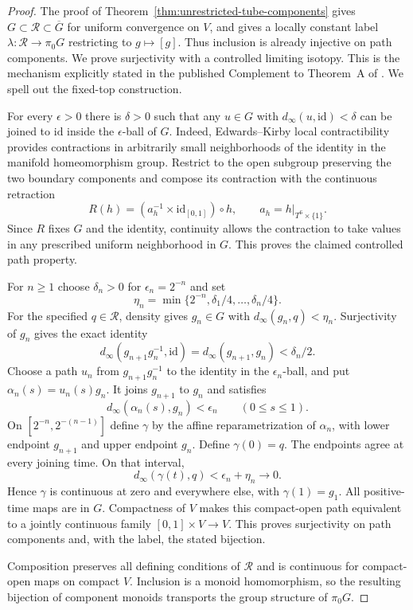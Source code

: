 \begin{proof}
The proof of Theorem~\ref{thm:unrestricted-tube-components} gives
$G\subset\mathcal R\subset\overline G$ for uniform convergence on
$V$, and gives a locally constant label
$\lambda:\mathcal R\to\pi_0G$ restricting to $g\mapsto[g]$.
Thus inclusion is already injective on path components.
We prove surjectivity with a controlled limiting isotopy.
This is the mechanism explicitly stated in the published Complement
to Theorem~A of
\cite[p.~272]{Siebenmann1972Approximation}.
We spell out the fixed-top construction.

For every $\epsilon>0$ there is $\delta>0$ such that any
$u\in G$ with $d_\infty(u,\mathrm{id})<\delta$ can be joined to
$\mathrm{id}$ inside the $\epsilon$-ball of $G$.
Indeed, Edwards--Kirby local contractibility
\cite[Corollary~1.1, pp.~63, 77]{EdwardsKirby1971}
provides contractions in arbitrarily small neighborhoods of the
identity in the manifold homeomorphism group.
Restrict to the open subgroup preserving the two boundary components
and compose its contraction with the continuous retraction
\[
 R(h)=(a_h^{-1}\times\mathrm{id}_{[0,1]})\circ h,
 \qquad a_h=h|_{T^6\times\{1\}}.
\]
Since $R$ fixes $G$ and the identity, continuity allows the
contraction to take values in any prescribed uniform neighborhood
in $G$.  This proves the claimed controlled path property.

For $n\geq1$ choose $\delta_n>0$ for
$\epsilon_n=2^{-n}$ and set
\[
 \eta_n=\min\{2^{-n},\delta_1/4,\ldots,\delta_n/4\}.
\]
For the specified $q\in\mathcal R$, density gives $g_n\in G$ with
$d_\infty(g_n,q)<\eta_n$.
Surjectivity of $g_n$ gives the exact identity
\[
 d_\infty(g_{n+1}g_n^{-1},\mathrm{id})
   =d_\infty(g_{n+1},g_n)<\delta_n/2.
\]
Choose a path $u_n$ from $g_{n+1}g_n^{-1}$ to the identity in the
$\epsilon_n$-ball, and put $\alpha_n(s)=u_n(s)g_n$.
It joins $g_{n+1}$ to $g_n$ and satisfies
\[
 d_\infty(\alpha_n(s),g_n)<\epsilon_n
 \qquad(0\leq s\leq1).
\]
On $[2^{-n},2^{-(n-1)}]$ define $\gamma$ by the affine
reparametrization of $\alpha_n$, with lower endpoint $g_{n+1}$
and upper endpoint $g_n$.  Define $\gamma(0)=q$.
The endpoints agree at every joining time.  On that interval,
\[
 d_\infty(\gamma(t),q)<\epsilon_n+\eta_n\longrightarrow0.
\]
Hence $\gamma$ is continuous at zero and everywhere else, with
$\gamma(1)=g_1$.  All positive-time maps are in $G$.
Compactness of $V$ makes this compact-open path equivalent to a
jointly continuous family $[0,1]\times V\to V$.
This proves surjectivity on path components and, with the label,
the stated bijection.

Composition preserves all defining conditions of $\mathcal R$
and is continuous for compact-open maps on compact $V$.
Inclusion is a monoid homomorphism, so the resulting bijection of
component monoids transports the group structure of $\pi_0G$.
\end{proof}

